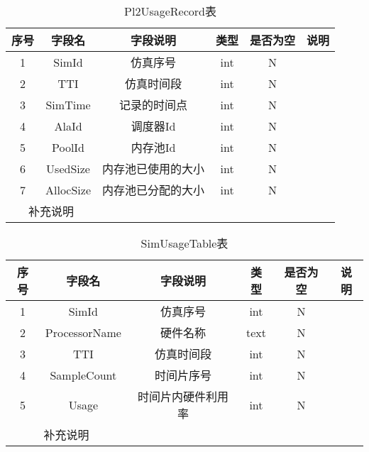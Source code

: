 \begin{table}[!h]
    \centering\normalsize
    \caption{Pl2UsageRecord表}
    \begin{tabular}{|c|c|c|c|c|c|}
    \hline
    \textbf{序号} & \textbf{字段名} & \textbf{字段说明} & \textbf{类型} & \textbf{是否为空} & \textbf{说明} \\ \hline
    1           & SimId        & 仿真序号          & int         & N             &             \\ \hline
    2           & TTI          & 仿真时间段         & int         & N             &             \\ \hline
    3           & SimTime      & 记录的时间点        & int         & N             &             \\ \hline
    4           & AlaId        & 调度器Id         & int         & N             &             \\ \hline
    5           & PoolId       & 内存池Id         & int         & N             &             \\ \hline
    6           & UsedSize     & 内存池已使用的大小     & int         & N             &             \\ \hline
    7           & AllocSize    & 内存池已分配的大小     & int         & N             &             \\ \hline
    \multicolumn{2}{|c|}{补充说明} &               &             &               &             \\ \hline
    \end{tabular}
    \end{table}

\begin{table}[!h]
    \centering\normalsize
    \caption{SimUsageTable表}
    \begin{tabular}{|c|c|c|c|c|c|}
    \hline
    \textbf{序号} & \textbf{字段名}  & \textbf{字段说明} & \textbf{类型} & \textbf{是否为空} & \textbf{说明} \\ \hline
    1           & SimId         & 仿真序号          & int         & N             &             \\ \hline
    2           & ProcessorName & 硬件名称          & text        & N             &             \\ \hline
    3           & TTI           & 仿真时间段         & int         & N             &             \\ \hline
    4           & SampleCount   & 时间片序号         & int         & N             &             \\ \hline
    5           & Usage         & 时间片内硬件利用率     & int         & N             &             \\ \hline
    \multicolumn{2}{|c|}{补充说明} &               &             &               &             \\ \hline
    \end{tabular}
    \end{table}

